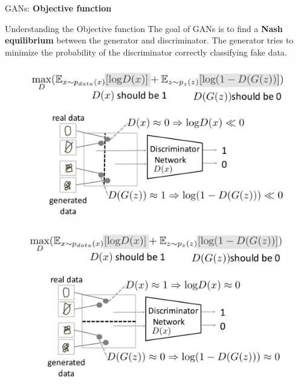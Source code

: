 \begin{frame}{}
    \LARGE GANs: \textbf{Objective function}
\end{frame}

\begin{frame}[allowframebreaks]{Understanding the Objective function}
The goal of GANs is to find a \textbf{Nash equilibrium} between the generator and discriminator. 
The generator tries to minimize the probability of the discriminator correctly classifying fake data.
\begin{figure}
    \centering
    \includegraphics[height=0.7\textheight, width=\textwidth, keepaspectratio]{images/gan/gan_cost_1.png}
\end{figure}

\framebreak
\begin{figure}
    \centering
    \includegraphics[height=0.9\textheight, width=\textwidth, keepaspectratio]{images/gan/gan_cost_2.png}
\end{figure}


\end{frame}
